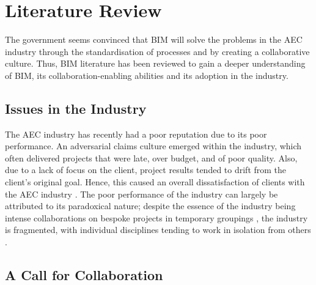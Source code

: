 \chapter{Literature Review} %

\label{Chapter2} %


The government seems convinced that BIM will solve the problems in the AEC industry through the standardisation of processes and by creating a collaborative culture.
Thus, BIM literature has been reviewed to gain a deeper understanding of BIM, its collaboration-enabling abilities and its adoption in the industry.

\section{Issues in the Industry}

The AEC industry has recently had a poor reputation due to its poor performance.
An adversarial claims culture emerged within the industry, which often delivered projects that were late, over budget, and of poor quality.
Also, due to a lack of focus on the client, project results tended to drift from the client's original goal.
Hence, this caused an overall dissatisfaction of clients with the AEC industry \citep{lecnotes, Egan1998}.
The poor performance of the industry can largely be attributed to its paradoxical nature; despite the essence of the industry being intense collaborations on bespoke projects in temporary groupings \citep{Laakso2012}, the industry is fragmented, with individual disciplines tending to work in isolation from others \citep{GCS16-20,Miettinen2014}.



\section{A Call for Collaboration}


